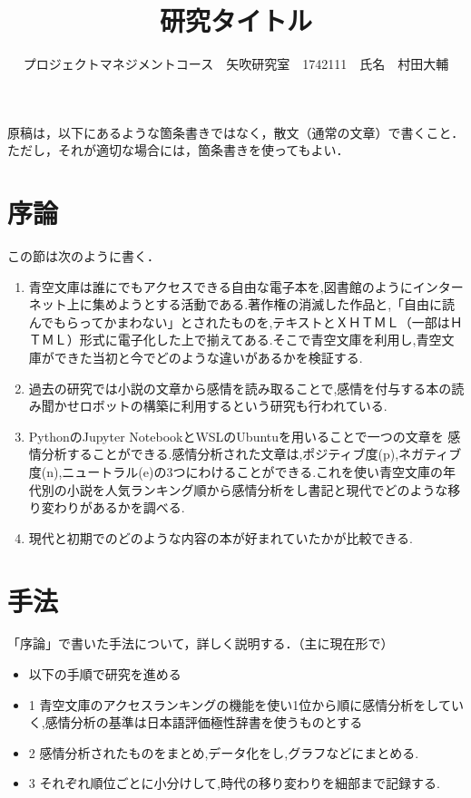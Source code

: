 \documentclass[uplatex,twocolumn,dvipdfmx,10pt]{jsarticle}
\title{\vspace{-5mm}\fontsize{14pt}{0pt}\selectfont 研究タイトル}
\author{\normalsize プロジェクトマネジメントコース　矢吹研究室　1742111　氏名　村田大輔}
\date{}
\begin{document}
\maketitle



原稿は，以下にあるような箇条書きではなく，散文（通常の文章）で書くこと．
ただし，それが適切な場合には，箇条書きを使ってもよい．

\section{序論}

この節は次のように書く．

\begin{enumerate}
\item 青空文庫は誰にでもアクセスできる自由な電子本を,図書館のようにインターネット上に集めようとする活動である.著作権の消滅した作品と,「自由に読んでもらってかまわない」とされたものを,テキストとＸＨＴＭＬ（一部はＨＴＭＬ）形式に電子化した上で揃えてある.そこで青空文庫を利用し,青空文庫ができた当初と今でどのような違いがあるかを検証する.
\item 過去の研究では小説の文章から感情を読み取ることで,感情を付与する本の読み聞かせロボットの構築に利用するという研究も行われている.
\item PythonのJupyter NotebookとWSLのUbuntuを用いることで一つの文章を
感情分析することができる.感情分析された文章は,ポジティブ度(p),ネガティブ度(n),ニュートラル(e)の3つにわけることができる.これを使い青空文庫の年代別の小説を人気ランキング順から感情分析をし書記と現代でどのような移り変わりがあるかを調べる.
\item 現代と初期でのどのような内容の本が好まれていたかが比較できる.
\end{enumerate}



\section{手法}

「序論」で書いた手法について，詳しく説明する．（主に現在形で）

\begin{itemize}
\item 以下の手順で研究を進める
\item 1 青空文庫のアクセスランキングの機能を使い1位から順に感情分析をしていく,感情分析の基準は日本語評価極性辞書を使うものとする
\item 2 感情分析されたものをまとめ,データ化をし,グラフなどにまとめる.
\item 3 それぞれ順位ごとに小分けして,時代の移り変わりを細部まで記録する.
\end{itemize}
\end{document}
